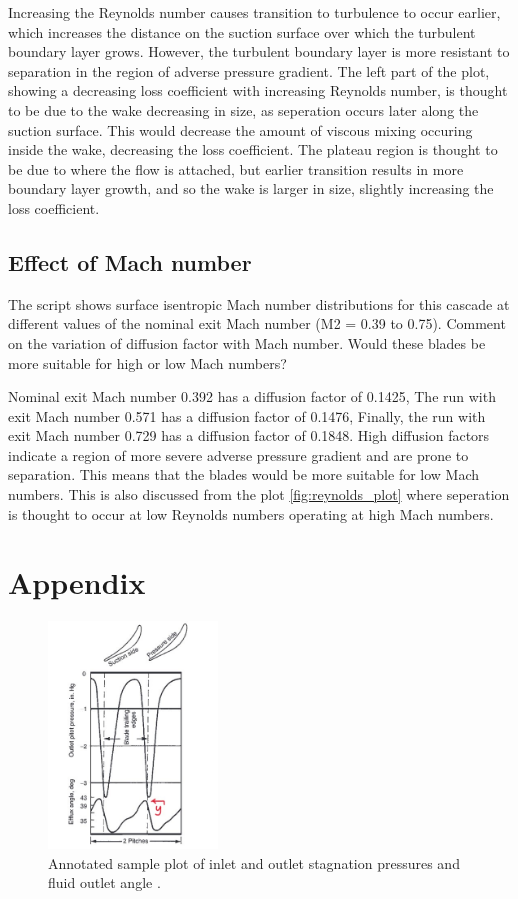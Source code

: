 \documentclass{article}
\begin{document}
Increasing the Reynolds number causes transition to turbulence to occur earlier, which increases the distance on the suction surface over which the turbulent boundary layer grows.
However, the turbulent boundary layer is more resistant to separation in the region of adverse pressure gradient.
The left part of the plot, showing a decreasing loss coefficient with increasing Reynolds number, is thought to be due to the wake decreasing in size, as seperation occurs later along the suction surface.
This would decrease the amount of viscous mixing occuring inside the wake, decreasing the loss coefficient.
The plateau region is thought to be due to where the flow is attached, but earlier transition results in more boundary layer growth, and so the wake is larger in size, slightly increasing the loss coefficient.


\subsection{Effect of Mach number}
The script shows surface isentropic Mach number distributions for this cascade at different
values of the nominal exit Mach number (M2 = 0.39 to 0.75). Comment on the variation of
diffusion factor with Mach number. Would these blades be more suitable for high or low Mach
numbers?

Nominal exit Mach number 0.392 has a diffusion factor of 0.1425,
The run with exit Mach number 0.571 has a diffusion factor of 0.1476,
Finally, the run with exit Mach number 0.729 has a diffusion factor of 0.1848.
High diffusion factors indicate a region of more severe adverse pressure gradient and are prone to separation.
This means that the blades would be more suitable for low Mach numbers.
This is also discussed from the plot \ref{fig:reynolds_plot} where seperation is thought to occur at low Reynolds numbers operating at high Mach numbers.

\section{Appendix}

\begin{figure}[H]
    \centering
    \includegraphics[width=0.4\textwidth]{figures/example_traverse.jpg}
    \caption{Annotated sample plot of inlet and outlet stagnation pressures and fluid outlet angle \cite{fluidmech}.}
    \label{fig:example_traverse}
\end{figure}
\end{document}

